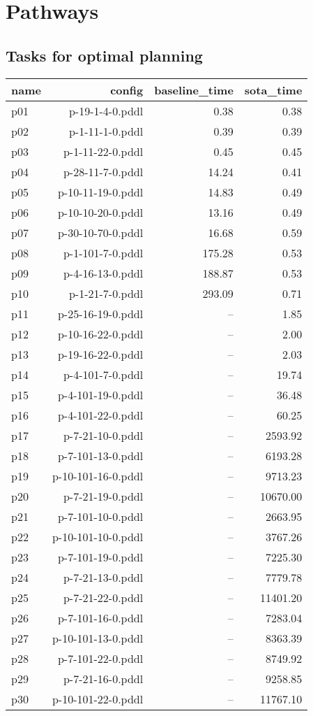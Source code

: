 \documentclass{article}
\begin{document}
                \newpage \section{Pathways}
                    \subsection*{Tasks for optimal planning}
                    
                            \begin{center}
                            \scriptsize
                            \begin{tabular}{@{}l|r|r|r@{}}
                            name & config & baseline\_time & sota\_time\\\midrule
                              p01& p-19-1-4-0.pddl&0.38&0.38\\
  p02& p-1-11-1-0.pddl&0.39&0.39\\
  p03& p-1-11-22-0.pddl&0.45&0.45\\
  p04& p-28-11-7-0.pddl&14.24&0.41\\
  p05& p-10-11-19-0.pddl&14.83&0.49\\
  p06& p-10-10-20-0.pddl&13.16&0.49\\
  p07& p-30-10-70-0.pddl&16.68&0.59\\
  p08& p-1-101-7-0.pddl&175.28&0.53\\
  p09& p-4-16-13-0.pddl&188.87&0.53\\
  p10& p-1-21-7-0.pddl&293.09&0.71\\
  p11& p-25-16-19-0.pddl&--&1.85\\
  p12& p-10-16-22-0.pddl&--&2.00\\
  p13& p-19-16-22-0.pddl&--&2.03\\
  p14& p-4-101-7-0.pddl&--&19.74\\
  p15& p-4-101-19-0.pddl&--&36.48\\
  p16& p-4-101-22-0.pddl&--&60.25\\
  p17& p-7-21-10-0.pddl&--&2593.92\\
  p18& p-7-101-13-0.pddl&--&6193.28\\
  p19& p-10-101-16-0.pddl&--&9713.23\\
  p20& p-7-21-19-0.pddl&--&10670.00\\
  p21& p-7-101-10-0.pddl&--&2663.95\\
  p22& p-10-101-10-0.pddl&--&3767.26\\
  p23& p-7-101-19-0.pddl&--&7225.30\\
  p24& p-7-21-13-0.pddl&--&7779.78\\
  p25& p-7-21-22-0.pddl&--&11401.20\\
  p26& p-7-101-16-0.pddl&--&7283.04\\
  p27& p-10-101-13-0.pddl&--&8363.39\\
  p28& p-7-101-22-0.pddl&--&8749.92\\
  p29& p-7-21-16-0.pddl&--&9258.85\\
  p30& p-10-101-22-0.pddl&--&11767.10
                            \end{tabular}
                            \end{center}
                    
\end{document}
